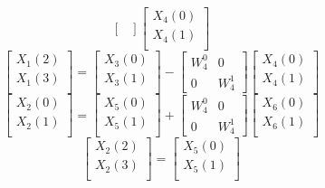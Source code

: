 \documentclass[journal,12pt,twocolumn]{IEEEtran}
\numberwithin{equation}{section}
\renewcommand\thesection{\arabic{section}}
\begin{document}
\begin{enumerate}[label=\arabic*.,ref=\thesection.\theenumi]
\begin{equation}
\begin{bmatrix}
\end{bmatrix}
\begin{bmatrix}
X_{4}(0) \\ 
X_{4}(1) \\ 
\end{bmatrix}
\end{equation}
\begin{equation}
\begin{bmatrix}
X_{1}(2) \\ 
X_{1}(3)\\ 
\end{bmatrix}
=
\begin{bmatrix}
X_{3}(0) \\ 
X_{3}(1)\\ 
\end{bmatrix}
-
\begin{bmatrix}
W^{0}_{4} & 0\\
0 & W^{1}_{4}
\end{bmatrix}
\begin{bmatrix}
X_{4}(0) \\ 
X_{4}(1) \\ 
\end{bmatrix}
\end{equation}
\begin{equation}
\begin{bmatrix}
X_{2}(0) \\ 
X_{2}(1)\\ 
\end{bmatrix}
=
\begin{bmatrix}
X_{5}(0) \\ 
X_{5}(1)\\ 
\end{bmatrix}
+
\begin{bmatrix}
W^{0}_{4} & 0\\
0 & W^{1}_{4}
\end{bmatrix}
\begin{bmatrix}
X_{6}(0) \\ 
X_{6}(1) \\ 
\end{bmatrix}
\end{equation}
\begin{equation}
\begin{bmatrix}
X_{2}(2) \\ 
X_{2}(3)\\ 
\end{bmatrix}
=
\begin{bmatrix}
X_{5}(0) \\ 
X_{5}(1)\\ 

\end{bmatrix}
\end{equation}
\end{enumerate}
\end{document}

